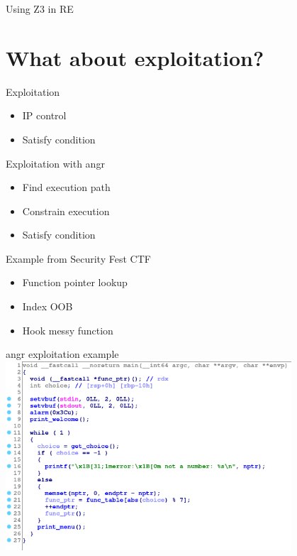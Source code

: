 \documentclass[10pt, compress, aspectratio=169]{beamer}
\begin{document}
\begin{frame}{Using Z3 in RE}
\section{What about exploitation?}
\end{frame}


\begin{frame}{Exploitation}
  \begin{itemize}
    \item IP control
    \item Satisfy condition
  \end{itemize}
\end{frame}

\begin{frame}{Exploitation with angr}
  \begin{itemize}
    \item Find execution path
    \item Constrain execution
    \item Satisfy condition
  \end{itemize}
\end{frame}

\begin{frame}{Example from Security Fest CTF}
  \begin{itemize}
    \item Function pointer lookup
    \item Index OOB
    \item Hook messy function
  \end{itemize}
\end{frame}

\begin{frame}{angr exploitation example}
  \includegraphics[width=0.8\textwidth]{images/exploit-2-ida.png}
\end{frame}
\end{document}
